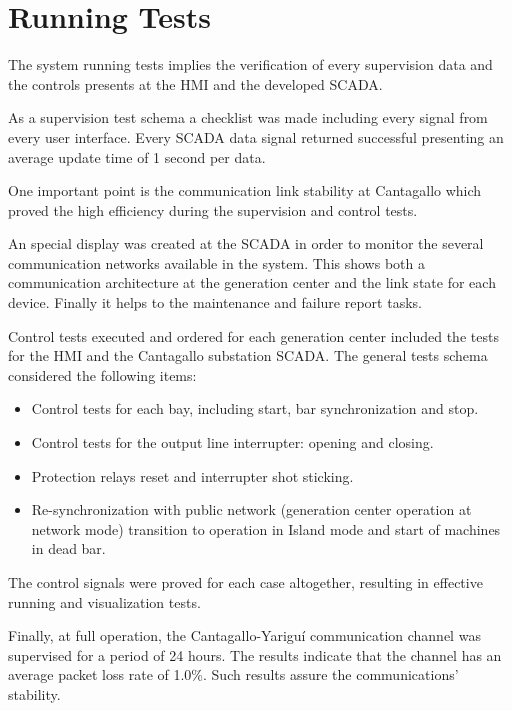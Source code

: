 
\section{Running Tests}

The system running tests implies the verification of every supervision
data and the controls presents at the HMI and the developed SCADA.

As a supervision test schema a checklist was made including every
signal from every user interface. Every SCADA data signal returned
successful presenting an average update time of 1 second per data.

One important point is the communication link stability at Cantagallo
which proved the high efficiency during the supervision and control
tests.

An special display was created at the SCADA in order to monitor the
several communication networks available in the system. This shows both
a communication architecture at the generation center and the link state
for each device. Finally it helps to the maintenance and failure report
tasks.

Control tests executed and ordered for each generation center included
the tests for the HMI and the Cantagallo substation SCADA. The general
tests schema considered the following items:

\begin{itemize}
\item Control tests for each bay, including start, bar synchronization and stop.
\item Control tests for the output line interrupter: opening and closing.
\item Protection relays reset and interrupter shot sticking.
\item Re-synchronization with public network (generation center operation at
  network mode) transition to operation in Island mode and start of
  machines in dead bar.
\end{itemize}

The control signals were proved for each case altogether, resulting in effective
running and visualization tests.

Finally, at full operation, the Cantagallo-Yariguí communication channel
was supervised for a period of 24 hours. The results indicate that the
channel has an average packet loss rate of 1.0\%. Such results assure
the communications' stability.
